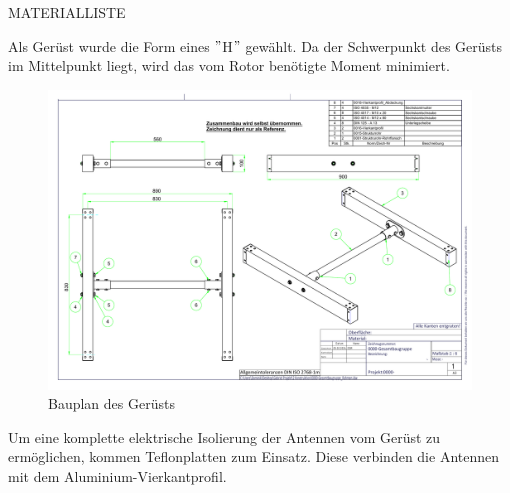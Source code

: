 MATERIALLISTE

Als Gerüst wurde die Form eines $"$H$"$ gewählt. Da der Schwerpunkt des Gerüsts im Mittelpunkt liegt, wird das vom Rotor benötigte Moment minimiert. 

\begin{figure}[h!]
	\centering
	\includegraphics[keepaspectratio=true,scale=0.5]{../ref/0000-Gesamtbaugruppe_Rahmen.pdf}
	\caption{Bauplan des Gerüsts}
	\label{fig:Gerüst}
\end{figure}

Um eine komplette elektrische Isolierung der Antennen vom Gerüst zu ermöglichen, kommen Teflonplatten zum Einsatz. Diese verbinden die Antennen mit dem Aluminium-Vierkantprofil.


